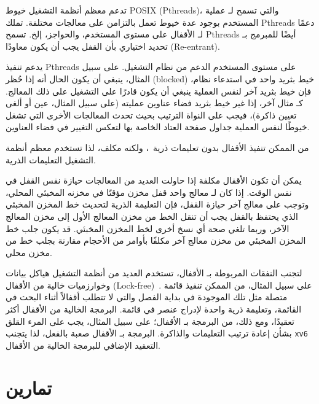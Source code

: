 تدعم معظم أنظمة التشغيل خيوط POSIX (Pthreads)، والتي تسمح لـ عملية المستخدم بوجود عدة خيوط تعمل بالتزامن على معالجات مختلفة.
تملك Pthreads دعمًا لـ الأقفال على مستوى المستخدم، والحواجز، إلخ.
تسمح Pthreads أيضًا للمبرمج بـ تحديد اختياري بأن القفل يجب أن يكون معاودًا (Re-entrant).

يدعم تنفيذ Pthreads على مستوى المستخدم الدعم من نظام التشغيل. على سبيل المثال، ينبغي أن يكون الحال أنه إذا حُظر (blocked) خيط بثريد واحد في استدعاء نظام، فإن خيط بثريد آخر لنفس العملية ينبغي أن يكون قادرًا على التشغيل على ذلك المعالج.
كـ مثال آخر، إذا غير خيط بثريد فضاء عناوين عمليته (على سبيل المثال، عين أو ألغى تعيين ذاكرة)، فيجب على النواة الترتيب بحيث تحدث المعالجات الأخرى التي تشغل خيوطًا لنفس العملية جداول صفحة العتاد الخاصة بها لتعكس التغيير في فضاء العناوين.

من الممكن تنفيذ الأقفال بدون تعليمات ذرية~\cite{lamport:bakery}، ولكنه مكلف، لذا تستخدم معظم أنظمة التشغيل التعليمات الذرية.

يمكن أن تكون الأقفال مكلفة إذا حاولت العديد من المعالجات حيازة نفس القفل في نفس الوقت.
إذا كان لـ معالج واحد قفل مخزن مؤقتًا في مخزنه المخبئي المحلي، وتوجب على معالج آخر حيازة القفل، فإن التعليمة الذرية لتحديث خط المخزن المخبئي الذي يحتفظ بالقفل يجب أن تنقل الخط من مخزن المعالج الأول إلى مخزن المعالج الآخر، وربما تلغي صحة أي نسخ أخرى لخط المخزن المخبئي.
قد يكون جلب خط المخزن المخبئي من مخزن معالج آخر مكلفًا بأوامر من الأحجام مقارنة بجلب خط من مخزن محلي.

لتجنب النفقات المربوطة بـ الأقفال، تستخدم العديد من أنظمة التشغيل هياكل بيانات وخوارزميات خالية من الأقفال (Lock-free)~\cite{herlihy:art,mckenney:rcuusage}.
على سبيل المثال، من الممكن تنفيذ قائمة متصلة مثل تلك الموجودة في بداية الفصل والتي لا تتطلب أقفالاً أثناء البحث في القائمة، وتعليمة ذرية واحدة لإدراج عنصر في قائمة.
البرمجة الخالية من الأقفال أكثر تعقيدًا، ومع ذلك، من البرمجة بـ الأقفال؛ على سبيل المثال، يجب على المرء القلق بشأن إعادة ترتيب التعليمات والذاكرة.
البرمجة بـ الأقفال صعبة بالفعل، لذا يتجنب \texttt{xv6} التعقيد الإضافي للبرمجة الخالية من الأقفال.

\section{تمارين}
\label{sec:exercises_lock}

